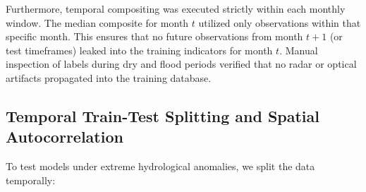 Furthermore, temporal compositing was executed strictly within each monthly window. The median composite for month $t$ utilized only observations within that specific month. This ensures that no future observations from month $t+1$ (or test timeframes) leaked into the training indicators for month $t$. Manual inspection of labels during dry and flood periods verified that no radar or optical artifacts propagated into the training database.



\subsection{Temporal Train-Test Splitting and Spatial Autocorrelation}
To test models under extreme hydrological anomalies, we split the data temporally:
